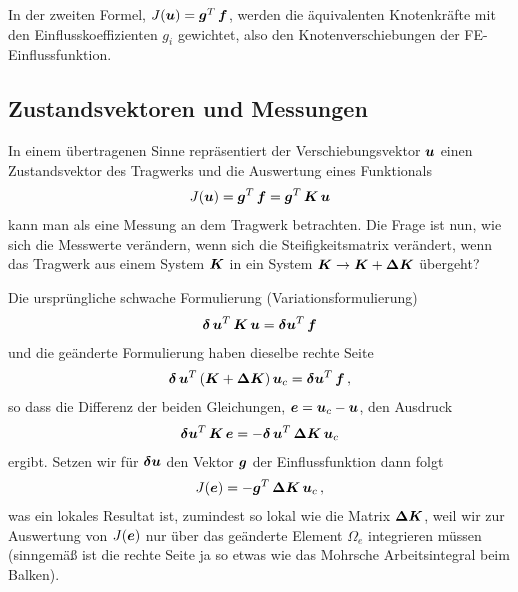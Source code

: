 In der zweiten Formel, $J(\mbox{\boldmath $u$}) = \mbox{\boldmath $g$}^T\,\mbox{\boldmath $f$}$, werden die \"{a}quivalenten Knotenkr\"{a}fte mit den Einflusskoeffizienten $g_i $ gewichtet, also den Knotenverschiebungen der FE-Einflussfunktion.

{\textcolor{sectionTitleBlue}{\section{Zustandsvektoren und Messungen}}}\label{Zustandsvektoren}

In einem \"{u}bertragenen Sinne repr\"{a}sentiert der Verschiebungsvektor $\mbox{\boldmath $u$}$ einen Zustandsvektor des Tragwerks und die Auswertung eines Funktionals
\begin{align}
J(\mbox{\boldmath $u$}) = \mbox{\boldmath $g$}^T\,\mbox{\boldmath $f$} = \mbox{\boldmath $g$}^T\,\mbox{\boldmath $K$}\,\mbox{\boldmath $u$}
\end{align}
kann man als eine Messung an dem Tragwerk betrachten. Die Frage ist nun, wie sich die Messwerte ver\"{a}ndern, wenn sich die Steifigkeitsmatrix ver\"{a}ndert, wenn das Tragwerk aus einem System $\mbox{\boldmath $K$}$ in ein System $\mbox{\boldmath $K$} \to \mbox{\boldmath $K$} + \mbox{\boldmath $\Delta$} \mbox{\boldmath $K$}$ \"{u}bergeht?

Die urspr\"{u}ngliche schwache Formulierung (Variationsformulierung)
\begin{align}
\mbox{\boldmath $\delta$}\,\mbox{\boldmath $u$}^T\,\mbox{\boldmath $K$}\,\mbox{\boldmath $u$}= \mbox{\boldmath $\delta$} \mbox{\boldmath $u$}^T \,\mbox{\boldmath $f$}
\end{align}
und die ge\"{a}nderte Formulierung haben dieselbe rechte Seite
\begin{align}
\mbox{\boldmath $\delta$}\,\mbox{\boldmath $u$}^T\,(\mbox{\boldmath $K$} + \mbox{\boldmath $\Delta$} \mbox{\boldmath $K$}) \,\mbox{\boldmath $u$}_c= \mbox{\boldmath $\delta$} \mbox{\boldmath $u$}^T \,\mbox{\boldmath $f$}\,,
\end{align}
so dass die Differenz der beiden Gleichungen, $\mbox{\boldmath $e$} = \mbox{\boldmath $u$}_c - \mbox{\boldmath $u$}$, den Ausdruck
\begin{align}
\mbox{\boldmath $\delta$} \mbox{\boldmath $u$}^T\,\mbox{\boldmath $K$}\,\mbox{\boldmath $e$} = - \mbox{\boldmath $\delta$} \,\mbox{\boldmath $u$}^T\,\mbox{\boldmath $\Delta$} \mbox{\boldmath $K$}\,\mbox{\boldmath $u$}_c
\end{align}
ergibt. Setzen wir f\"{u}r $\mbox{\boldmath $\delta$} \mbox{\boldmath $u$}$ den Vektor $\mbox{\boldmath $g$}$ der Einflussfunktion dann folgt
\begin{align}
J(\mbox{\boldmath $e$})= -  \mbox{\boldmath $g$}^T\,\mbox{\boldmath $\Delta$}\mbox{\boldmath $K$}\,\mbox{\boldmath $u$}_c\,,
\end{align}
was ein lokales Resultat ist, zumindest so lokal wie die Matrix $\mbox{\boldmath $\Delta$} \mbox{\boldmath $K$}$, weil wir zur Auswertung von $J(\mbox{\boldmath $e$})$ nur \"{u}ber das ge\"{a}nderte Element $\Omega_e$ integrieren m\"{u}ssen (sinngem\"{a}{\ss} ist die rechte Seite ja so etwas wie das Mohrsche Arbeitsintegral beim Balken).

